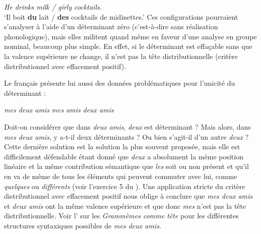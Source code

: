 \ea
\textit{{He drinks milk / girly cocktails.}}\\
\glt ‘Il boit \textbf{du} lait / \textbf{des} cocktails de midinettes.’
\z
Ces configurations pourraient s’analyser à l’aide d’un déterminant zéro (c’est-à-dire sans réalisation phonologique), mais elles militent quand même en faveur d’une analyse en groupe nominal, beaucoup plus simple. En effet, si le déterminant est effaçable sans que la valence supérieure ne change, il n’est pas la tête distributionnelle (critère distributionnel avec effacement positif).

Le français présente lui aussi des données problématiques pour l’unicité du déterminant :

\ea
  \ea \textit{mes deux amis}
  \ex \textit{mes amis}
  \ex \textit{deux amis}
  \z
\z

Doit-on considérer que dans \textit{deux amis}, \textit{deux} est déterminant ? Mais alors, dans \textit{mes deux amis}, y a-t-il deux déterminants ? Ou bien s’agit-il d’un autre \textit{deux} ? Cette dernière solution est la solution la plus souvent proposée, mais elle est difficilement défendable étant donné que \textit{deux} a absolument la même position linéaire et la même contribution sémantique que \textit{les} soit ou non présent et qu’il en va de même de tous les éléments qui peuvent commuter avec lui, comme \textit{quelques} ou \textit{différents} (voir l’exercice 5 du ). Une application stricte du critère distributionnel avec effacement positif nous oblige à conclure que \textit{mes deux amis} et \textit{deux amis} ont la même valence supérieure et que donc \textit{mes} n’est pas la tête distributionnelle. Voir l’ sur les \textit{Grammèmes comme tête} pour les différentes structures syntaxiques possibles de \textit{mes deux amis}.

